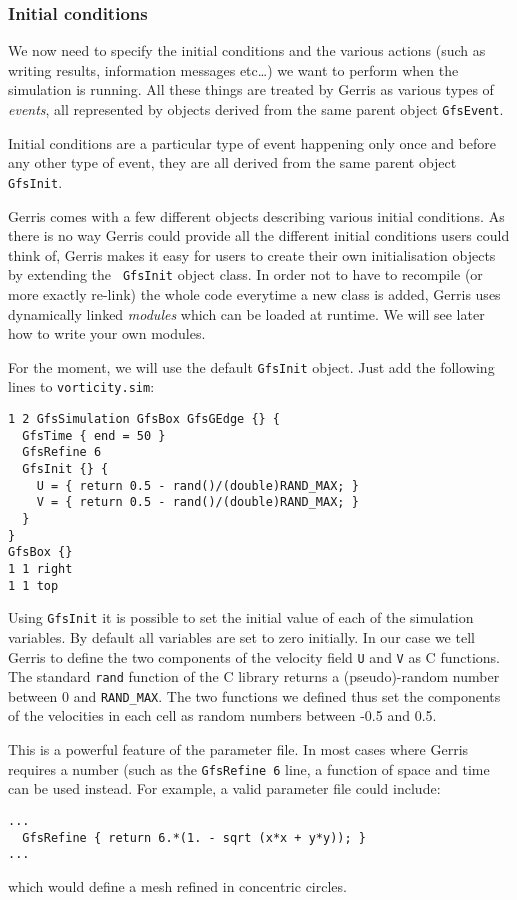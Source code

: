 \documentclass[a4paper]{article}
\begin{document}
\subsubsection{Initial conditions}

We now need to specify the initial conditions and the various actions
(such as writing results, information messages etc\dots) we want to
perform when the simulation is running. All these things are treated
by Gerris as various types of {\em events}, all represented by objects
derived from the same parent object {\tt GfsEvent}.

Initial conditions are a particular type of event happening only once
and before any other type of event, they are all derived from the same 
parent object {\tt GfsInit}.

Gerris comes with a few different objects describing various initial
conditions. As there is no way Gerris could provide all the different
initial conditions users could think of, Gerris makes it easy for
users to create their own initialisation objects by extending the {\tt
GfsInit} object class. In order not to have to recompile (or more
exactly re-link) the whole code everytime a new class is added, Gerris
uses dynamically linked {\em modules} which can be loaded at
runtime. We will see later how to write your own modules. 

For the moment, we will use the default {\tt GfsInit} object. Just add
the following lines to {\tt vorticity.sim}:
\begin{verbatim}
1 2 GfsSimulation GfsBox GfsGEdge {} {
  GfsTime { end = 50 }
  GfsRefine 6
  GfsInit {} {
    U = { return 0.5 - rand()/(double)RAND_MAX; }
    V = { return 0.5 - rand()/(double)RAND_MAX; }
  }
}
GfsBox {}
1 1 right
1 1 top
\end{verbatim}
Using {\tt GfsInit} it is possible to set the initial value of each of
the simulation variables. By default all variables are set to zero
initially. In our case we tell Gerris to define the two components of
the velocity field {\tt U} and {\tt V} as C functions. The standard
{\tt rand{}} function of the C library returns a (pseudo)-random
number between 0 and {\tt RAND\_MAX}. The two functions we defined
thus set the components of the velocities in each cell as random
numbers between -0.5 and 0.5.

This is a powerful feature of the parameter file. In most cases where Gerris requires a number (such as the {\tt GfsRefine 6} line, a function of space and time can be used instead. For example, a valid parameter file could include:
\begin{verbatim}
...
  GfsRefine { return 6.*(1. - sqrt (x*x + y*y)); }
...
\end{verbatim}
which would define a mesh refined in concentric circles.
\end{document}

